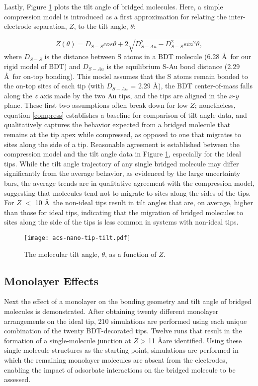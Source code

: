 \documentclass[10pt]{report}  %
\newcommand\findent{\hspace*{\parindent}}
\begin{document}
Lastly, Figure \ref{fig:acs-nano-tip-tilt} plots the tilt angle of bridged molecules. Here, a simple compression model is introduced as a first approximation for relating the inter-electrode separation, $Z$, to the tilt angle, $\theta$:

\begin{equation}Z(\theta) = D_{S-S}cos\theta + 2\sqrt{D_{S-Au}^{2}-D_{S-S}^{2}sin^{2}\theta},\label{compress}
\end{equation} where $D_{S-S}$ is the distance between S atoms in a BDT molecule (6.28 \AA\ for our rigid model of BDT) and $D_{S-Au}$ is the equilibrium S-Au bond distance (2.29 \AA\ for on-top bonding).  This model assumes that the S atoms remain bonded to the on-top sites of each tip (with $D_{S-Au}$ = 2.29 \AA), the BDT center-of-mass falls along the $z$ axis made by the two Au tips, and the tips are aligned in the $x$-$y$ plane.  These first two assumptions often break down for low $Z$; nonetheless, equation \ref{compress} establishes a baseline for comparison of tilt angle data, and qualitatively captures the behavior expected from a bridged molecule that remains at the tip apex while compressed, as opposed to one that migrates to sites along the side of a tip.  Reasonable agreement is established between the compression model and the tilt angle data in Figure \ref{fig:acs-nano-tip-tilt}, especially for the ideal tips.  While the tilt angle trajectory of any single bridged molecule may differ significantly from the average behavior, as evidenced by the large uncertainty bars, the average trends are in qualitative agreement with the compression model, suggesting that molecules tend not to migrate to sites along the sides of the tips.  For $Z$ $<$ 10 \AA\ the non-ideal tips result in tilt angles that are, on average, higher than those for ideal tips, indicating that the migration of bridged molecules to sites along the side of the tips is less common in systems with non-ideal tips.

\begin{figure}[]
	\centering
	\texttt{[image: acs-nano-tip-tilt.pdf]}
	\caption{The molecular tilt angle, $\theta$, as a function of $Z$.}
	\label{fig:acs-nano-tip-tilt}
\end{figure}

\subsection{Monolayer Effects}

\findent Next the effect of a monolayer on the bonding geometry and tilt angle of bridged molecules is demonstrated.  After obtaining twenty different monolayer arrangements on the ideal tip, 210 simulations are performed using each unique combination of the twenty BDT-decorated tips.  Twelve runs that result in the formation of a single-molecule junction at $Z$ > 11 \AA are identified.  Using these single-molecule structures as the starting point, simulations are performed in which the remaining monolayer molecules are absent from the electrodes, enabling the impact of adsorbate interactions on the bridged molecule to be assessed. 
\end{document}
